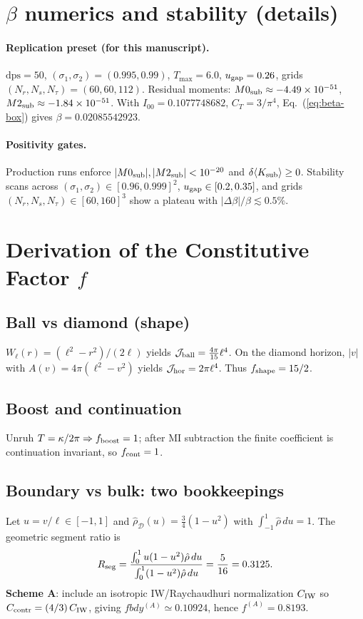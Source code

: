 \documentclass[aps,prd,onecolumn,superscriptaddress,nofootinbib]{revtex4-2}
\def\fbdy{fbdy}%
\newcommand{\fbdy}{f_{\rm bdy}}
\begin{document}
\section{\texorpdfstring{$\beta$}{beta} numerics and stability (details)}
\label{app:beta-numerics}
\paragraph*{Replication preset (for this manuscript).}
\noindent \(\mathrm{dps}=50\), \((\sigma_1,\sigma_2)=(0.995,0.99)\), \(T_{\max}=6.0\), \(u_{\rm gap}=0.26\), grids \((N_r,N_s,N_\tau)=(60,60,112)\). Residual moments: \(M0_{\rm sub}\approx-4.49\times 10^{-51}\), \(M2_{\rm sub}\approx-1.84\times 10^{-51}\). With \(I_{00}=0.1077748682\), \(C_T=3/\pi^4\), Eq.~(\ref{eq:beta-box}) gives \(\beta=0.02085542923\).

\paragraph*{Positivity gates.}
\noindent Production runs enforce \(|M0_{\rm sub}|,|M2_{\rm sub}|<10^{-20}\) and \(\delta\langle K_{\rm sub}\rangle \ge 0\). Stability scans across \((\sigma_1,\sigma_2)\in[0.96,0.999]^2\), \(u_{\rm gap}\in[0.2,0.35]\), and grids \((N_r,N_s,N_\tau)\in[60,160]^3\) show a plateau with \(|\Delta\beta|/\beta \lesssim 0.5\%\).

\section{Derivation of the Constitutive Factor $f$}
\label{app:f-normalization}
\subsection{Ball vs diamond (shape)}
$W_\ell(r)=(\ell^2-r^2)/(2\ell)$ yields $\mathcal J_{\rm ball}=\frac{4\pi}{15}\ell^4$.
On the diamond horizon, $|v|$ with $A(v)=4\pi(\ell^2-v^2)$ yields $\mathcal J_{\rm hor}=2\pi\ell^4$.
Thus $f_{\rm shape}=15/2$.

\subsection{Boost and continuation}
Unruh $T=\kappa/2\pi\Rightarrow f_{\rm boost}=1$; after MI subtraction the finite coefficient is continuation invariant, so $f_{\rm cont}=1$.

\subsection{Boundary vs bulk: two bookkeepings}
\label{app:fbdy-derivation}
Let $u=v/\ell\in[-1,1]$ and $\hat\rho_{\mathcal D}(u)=\tfrac{3}{4}(1-u^2)$ with $\int_{-1}^1\hat\rho\,du=1$.
The geometric segment ratio is
\[
R_{\rm seg}=
\frac{\int_{0}^{1} u(1-u^2)\hat\rho\,du}{\int_{0}^{1} (1-u^2)\hat\rho\,du}
=\frac{5}{16}=0.3125.
\]
\textbf{Scheme A}: include an isotropic IW/Raychaudhuri normalization $C_{\rm IW}$ so $C_{\rm contr}=({4}/{3})\,C_{\rm IW}$, giving $\fbdy^{(A)}\simeq0.10924$, hence $f^{(A)}=0.8193$.
\end{document}
